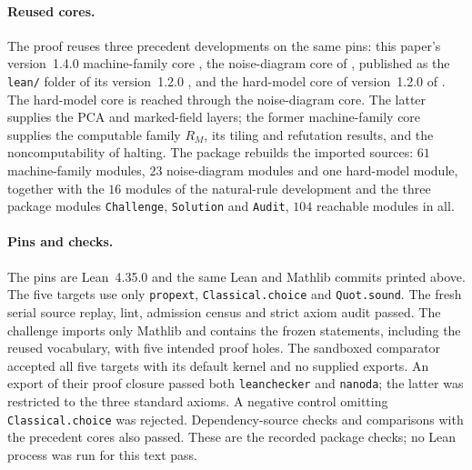 \paragraph{Reused cores.} The proof reuses three precedent developments on the same pins: this paper's version~1.4.0 machine-family core \cite{DMforgetting14}, the noise-diagram core of \cite{DMdiagram}, published as the \texttt{lean/} folder of its version~1.2.0 \cite{DMdiagramLean}, and the hard-model core of version~1.2.0 of \cite{DMhard}. The hard-model core is reached through the noise-diagram core. The latter supplies the PCA and marked-field layers; the former machine-family core supplies the computable family $R_M$, its tiling and refutation results, and the noncomputability of halting. The package rebuilds the imported sources: $61$ machine-family modules, $23$ noise-diagram modules and one hard-model module, together with the $16$ modules of the natural-rule development and the three package modules \texttt{Challenge}, \texttt{Solution} and \texttt{Audit}, $104$ reachable modules in all.

\paragraph{Pins and checks.} The pins are Lean~4.35.0 and the same Lean and Mathlib commits printed above. The five targets use only \texttt{propext}, \texttt{Classical.choice} and \texttt{Quot.sound}. The fresh serial source replay, lint, admission census and strict axiom audit passed. The challenge imports only Mathlib and contains the frozen statements, including the reused vocabulary, with five intended proof holes. The sandboxed comparator accepted all five targets with its default kernel and no supplied exports. An export of their proof closure passed both \texttt{leanchecker} and \texttt{nanoda}; the latter was restricted to the three standard axioms. A negative control omitting \texttt{Classical.choice} was rejected. Dependency-source checks and comparisons with the precedent cores also passed. These are the recorded package checks; no Lean process was run for this text pass.

